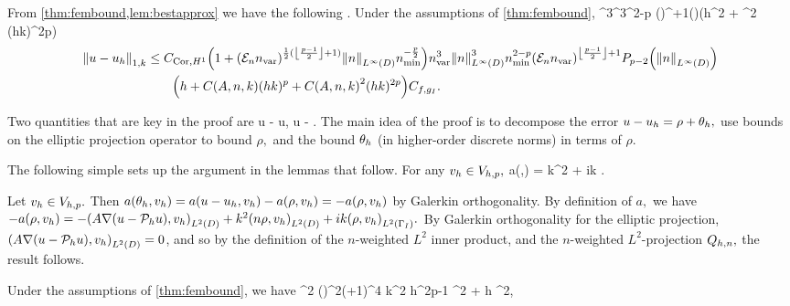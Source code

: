 From \cref{thm:fembound,lem:bestapprox} we have the following .
\label{cor:fembound}
Under the assumptions of \cref{thm:fembound},
\beqs
{} \leq \CcorLt \nvar^3^3\nmin^{2-p} \mleft(\En \nvar\mright)^{+1}\mleft(\mright)\mleft(h^2 + \CAnk^2 (hk)^{2p}\mright)\Cfg\tand
\eeqs
\begin{align*}
\NW{u-\uh} &\leq \CcorHo \mleft(1+\mleft(\En\nvar\mright)^{\half(\floor{\frac{p-1}2}+1)}\NLiD{n}\nmin^{-\frac{p}2}\mright)\nvar^3\NLiD{n}^3\nmin^{2-p} \mleft(\En \nvar\mright)^{\floor{\frac{p-1}2}+1}\Pfn{p-2}\mleft(\NLiD{n}\mright)\\
&\quad\quad\mleft(h + \CAnk (hk)^p + \CAnk^2 (hk)^{2p}\mright)\Cfg.
\end{align*}
\eco

Two quantities that are key in the proof are
\beqs
\rho \de u - \Ph u, \tand
\eeqs
\beqs
\thetah \de \Ph u - \uh.
\eeqs
The main idea of the proof is to decompose the error $u - u_{h} = \rho + \theta_{h},$ use bounds on the elliptic projection operator to bound $\rho,$ and the bound $\theta_{h}$ (in higher-order discrete norms) in terms of $\rho.$

The following simple  sets up the argument in the lemmas that follow.
\label{lem:simpleform}
For any $v_{h} \in V_{h,p},$
\beq\label{eq:thetaform}
a(\thetah,\vh) = k^2\IPLtDn{\Qhn\rho}{\vh} + ik \IPLtGI{\rho}{\vh}.
\eeq
\ele

Let $v_{h} \in V_{h,p}.$ Then $a(\theta_{h},v_{h}) = a(u-u_{h},v_{h}) - a(\rho,v_{h}) = -a(\rho,v_{h})$ by Galerkin orthogonality. By definition of $a,$ we have $-a(\rho,\vh) = -\IPLtD{A\grad\mleft(u-\Ph u\mright)}{\vh} + k^2 \IPLtD{n\rho}{\vh} + ik\IPLtGI{\rho}{\vh}.$ By Galerkin orthogonality for the elliptic projection, $\IPLtD{A\grad\mleft(u-\Ph u\mright)}{\vh} = 0$, and so by the definition of the $n$-weighted $L^2$ inner product, and the $n$-weighted $L^2$-projection $Q_{h,n},$ the result follows.
\epf

\label{lem:boundarybound}
Under the assumptions of \cref{thm:fembound}, we have
\beq\label{eq:boundarybound}
\NLtGI{\thetah}^2 \leq \Cboundaryo \mleft(\En\nvar\mright)^{2\mleft(+1\mright)}^4 k^2 h^{2p-1} ^2 + \Cboundaryt h \NW{\rho}^2,
\eeq
\ele

